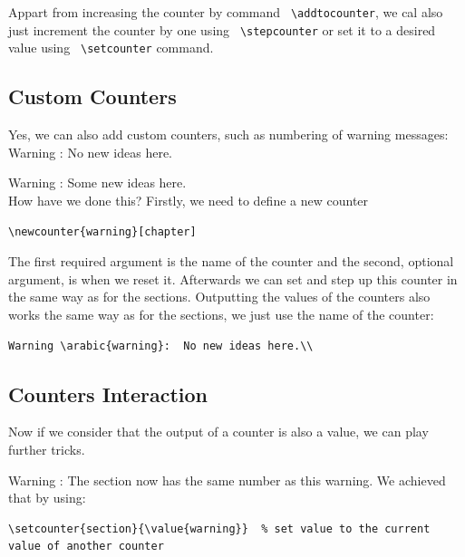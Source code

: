 \documentclass[a4paper,10pt]{report} %
\begin{document}
Appart from increasing the counter by command \texttt{ \textbackslash addtocounter}, we cal also just increment the counter by one using \texttt{ \textbackslash stepcounter} or set it to a desired value using \texttt{ \textbackslash setcounter} command. 
  
\subsection{Custom Counters}
Yes, we can also add custom counters, such as numbering of warning messages:\\

 Warning :  No new ideas here.\\
 \addtocounter{warning}{4}
 Warning :  Some new ideas here.\\
 
 How have we done this? Firstly, we need to define a new counter
\begin{lstlisting}[language={[latex]tex}, frame=single,basicstyle=\footnotesize]
  \newcounter{warning}[chapter] 
\end{lstlisting}
The first required argument is the name of the counter and the second, optional argument, is when we reset it.
Afterwards we can set and step up this counter in the same way as for the sections. Outputting the values  of the counters also works the same way as for the sections, we just use the name of the counter:
\begin{lstlisting}[language={[latex]tex}, frame=single,basicstyle=\footnotesize]
  Warning \arabic{warning}:  No new ideas here.\\
\end{lstlisting}

\setcounter{section}{\value{warning}}

\subsection{Counters Interaction}
Now if we consider that the output of a counter is also a value, we can play further tricks. 

Warning :  The section now has the same number as this warning. We achieved that by using:\\

\begin{lstlisting}[language={[latex]tex}, frame=single,basicstyle=\footnotesize]
\setcounter{section}{\value{warning}}  % set value to the current  value of another counter 
\end{lstlisting}
\end{document}

